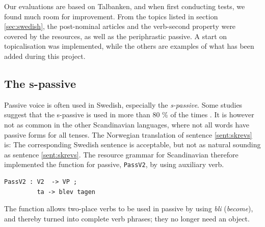 \documentclass{report}
\begin{document}
Our evaluations are based on Talbanken, and when first conducting tests,
 we found much room for improvement.
From the topics listed in section \ref{sec:swedish}, the post-nominal articles
and the verb-second property
were covered by the resources, as well as the periphrastic passive.
A start on topicalisation was implemented, while
the others are examples of what has been added during this project.

\subsection{The s-passive}
Passive voice is often used in Swedish, especially the
\textit{s-passive}.
\label{sent:skrevs}
Some studies suggest that the s-passive is used in more than 80 \% of the times
\cite{laanemets}.
It is however not as common in the other Scandinavian languages, 
where not all words have passive forms for all tenses. The Norwegian 
translation of sentence \ref{sent:skrevs} is:
The corresponding Swedish sentence is acceptable, but not as natural sounding as sentence
\ref{sent:skrevs}.
The resource grammar for Scandinavian therefore implemented the function for passive,
\verb-PassV2-, by using auxiliary verb. \\
\begin{verbatim}
PassV2 : V2  -> VP ;
         ta -> blev tagen
\end{verbatim}
The function allows two-place verbs to be used in passive by using \emph{bli} (\emph{become}), and thereby
turned into complete verb phrases; they no longer need an object.\\
\end{document}
